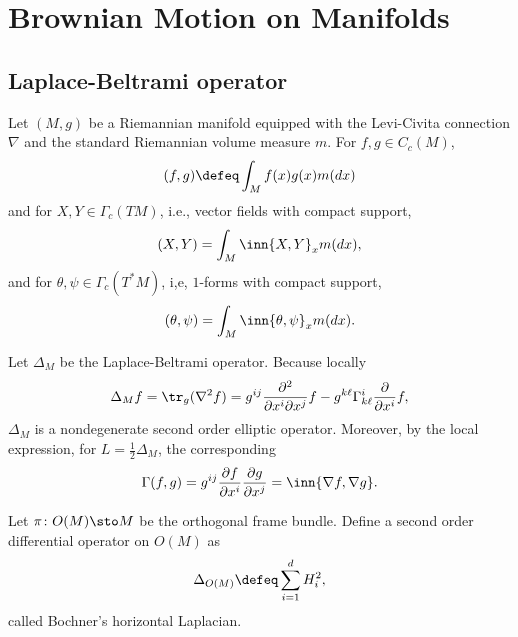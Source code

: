 \chapter{Brownian Motion on Manifolds}

\section{Laplace-Beltrami operator}

Let $(M,g)$ be a Riemannian manifold equipped with the Levi-Civita connection $\nabla$ and the standard Riemannian volume measure $m$. For $f,g \in C_c(M)$,
\begin{equation*}
    (f,g) \defeq \int_M f(x)g(x)m(dx)
\end{equation*}
and for $X,Y \in \Gamma_c(TM)$, i.e., vector fields with compact support,
\begin{equation*}
    (X,Y) = \int_M \inn{X,Y}_x m(dx),
\end{equation*}
and for $\theta,\psi \in \Gamma_c(T^*M)$, i,e, $1$-forms with compact support,
\begin{equation*}
    (\theta,\psi) = \int_M \inn{\theta,\psi}_x m(dx).
\end{equation*}

Let $\Delta_M$ be the Laplace-Beltrami operator. Because locally
\begin{equation*}
    \Delta_Mf = \tr_g(\nabla^2 f) = g^{ij}\frac{\partial^2}{\partial x^i\partial x^j}f - g^{k \ell}\Gamma^i_{k\ell}\frac{\partial}{\partial x^i}f,
\end{equation*}
$\Delta_M$ is a nondegenerate second order elliptic operator. Moreover, by the local expression, for $L = \frac{1}{2}\Delta_M$, the corresponding
\begin{equation*}
    \Gamma(f,g) = g^{ij}\frac{\partial f}{\partial x^i}\frac{\partial g}{\partial x^j} = \inn{\nabla f, \nabla g}.
\end{equation*}

Let $\pi \colon O(M) \sto M$ be the orthogonal frame bundle. Define a second order differential operator on $O(M)$ as
\begin{equation*}
    \Delta_{O(M)} \defeq \sum_{i=1}^d H_i^2,
\end{equation*}
called Bochner's horizontal Laplacian.

